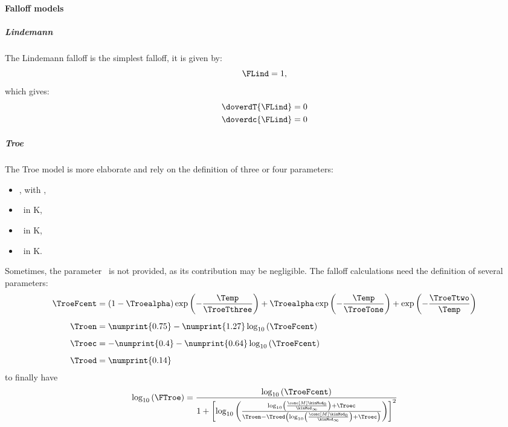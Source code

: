 \paragraph{Falloff models}
\subparagraph{Lindemann}
The Lindemann falloff is the simplest falloff, it is given by:
\begin{equation}
\FLind = 1,
\label{Falloff:Lindeman}
\end{equation}
which gives:
\begin{equation}
\begin{split}
\doverdT{\FLind} & = 0 \\
\doverdc{\FLind} & = 0 \\
\end{split}
\label{Falloff:Lindemann:diff}
\end{equation}

\subparagraph{Troe}
The Troe model is more elaborate and rely on the definition of three or
four parameters:
\begin{itemize}
\item \Troealpha, with \nounit,
\item \TroeTone\ in \unit{K},
\item \TroeTtwo\ in \unit{K},
\item \TroeTthree\ in \unit{K}.
\end{itemize}
Sometimes, the parameter \TroeTtwo\ is not provided, as its contribution
may be negligible.
The falloff calculations need the definition of several parameters:
\begin{equation}
\begin{split}
\TroeFcent & = \left(1 - \Troealpha\right)\exp\left(-\frac{\Temp}{\TroeTthree}\right)
              +          \Troealpha       \exp\left(-\frac{\Temp}{\TroeTone}\right)
              +                           \exp\left(-\frac{\TroeTtwo}{\Temp}\right) \\[5pt]
\Troen     & =   \numprint{0.75} - \numprint{1.27}\log_{10}\left(\TroeFcent\right)  \\[5pt]
\Troec     & = - \numprint{0.4}  - \numprint{0.64}\log_{10}\left(\TroeFcent\right)  \\[5pt]
\Troed     & =   \numprint{0.14}
\end{split}
\label{Troe:parameter}
\end{equation}
to finally have
\newcommand{\pr}{\ensuremath{\log_{10}\left(\frac{\conc[M]\kinMod_0}{\kinMod_\infty}\right)}}
\begin{equation}
\log_{10}\left(\FTroe\right) 
        = \frac{\log_{10}\left(\TroeFcent\right)}
              {1 + \left[
                        \log_{10}\left(
                                        \frac{\pr + \Troec}
                                             {\Troen - \Troed\left(
                                                                \pr + \Troec
                                                            \right)}
                                 \right) 
                   \right]^2}
\label{Troe:F}
\end{equation}
